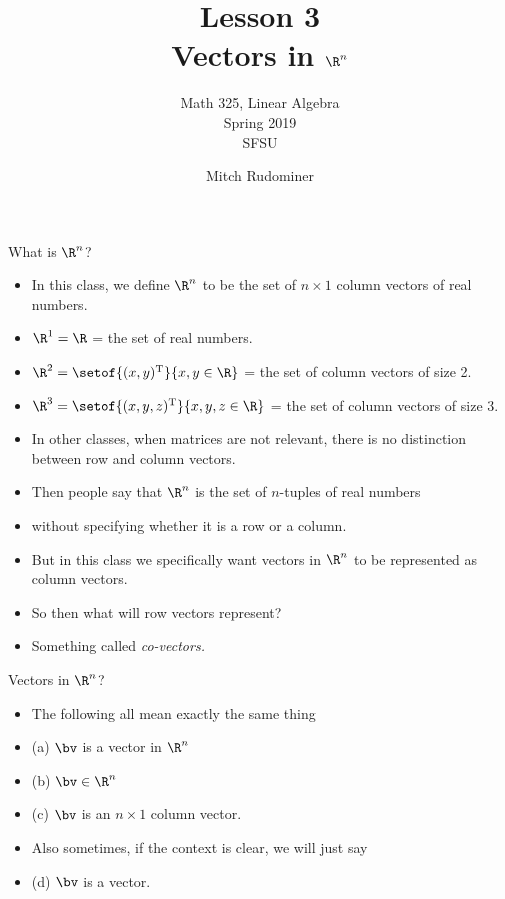 \documentclass{beamer}
\title{Lesson 3 \\ Vectors in $\R^n$}
\subtitle{Math 325, Linear Algebra \\ Spring 2019 \\ SFSU}
\author{Mitch Rudominer}
\date{}
\begin{document}
\begin{frame}
  \titlepage
\end{frame}

\begin{frame}{What is $\R^n$?}

\begin{itemize}
\item In this class, we define $\R^n$ to be the set of $n\times 1$ column vectors of real numbers.
\item $\R^1=\R$ = the set of real numbers.
\item $\R^2 = \setof{(x,y)^{\text{T}}}{x,y\in\R}$ = the set of column vectors of size 2.
\item $\R^3 = \setof{(x,y,z)^{\text{T}}}{x,y,z\in\R}$ = the set of
column vectors of size 3.
\item In other classes, when matrices are not relevant, there is no distinction between row
and column vectors.
\item Then people say that $\R^n$ is the set of $n$-tuples of real numbers
\item without specifying whether it is a row or a column.
\item But in this class we specifically want vectors in $\R^n$ to be
represented as column vectors.
\item So then what will row vectors represent?
\item Something called \emph{co-vectors.}
\end{itemize}

\end{frame}

\begin{frame}{Vectors in $\R^n$?}

\begin{itemize}
\item The following all mean exactly the same thing
\item (a) $\bv$ is a vector in $\R^n$
\item (b) $\bv \in \R^n$
\item (c) $\bv$ is an $n\times 1$ column vector.
\item Also sometimes, if the context is clear, we will just say
\item (d) $\bv$ is a vector.
\end{itemize}

\end{frame}

\beamerdefaultoverlayspecification{}
\end{document}

